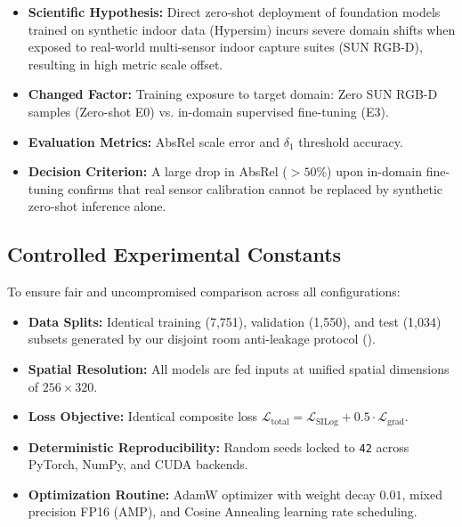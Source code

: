 \documentclass[twoside,final]{hcmut-report}
\begin{document}
\begin{itemize}[leftmargin=*]

  \item \textbf{Scientific Hypothesis:} Direct zero-shot deployment of foundation models trained on synthetic indoor data (Hypersim) incurs severe domain shifts when exposed to real-world multi-sensor indoor capture suites (SUN RGB-D), resulting in high metric scale offset.

  \item \textbf{Changed Factor:} Training exposure to target domain: Zero SUN RGB-D samples (Zero-shot E0) vs. in-domain supervised fine-tuning (E3).

  \item \textbf{Evaluation Metrics:} AbsRel scale error and $\delta_1$ threshold accuracy.

  \item \textbf{Decision Criterion:} A large drop in AbsRel ($>50\%$) upon in-domain fine-tuning confirms that real sensor calibration cannot be replaced by synthetic zero-shot inference alone.

\end{itemize}

\subsection{Controlled Experimental Constants}

To ensure fair and uncompromised comparison across all configurations:

\begin{itemize}

  \item \textbf{Data Splits:} Identical training (7,751), validation (1,550), and test (1,034) subsets generated by our disjoint room anti-leakage protocol ().

  \item \textbf{Spatial Resolution:} All models are fed inputs at unified spatial dimensions of $256 \times 320$.

  \item \textbf{Loss Objective:} Identical composite loss $\mathcal{L}_{\text{total}} = \mathcal{L}_{\text{SILog}} + 0.5 \cdot \mathcal{L}_{\text{grad}}$.

  \item \textbf{Deterministic Reproducibility:} Random seeds locked to \texttt{42} across PyTorch, NumPy, and CUDA backends.

  \item \textbf{Optimization Routine:} AdamW optimizer with weight decay $0.01$, mixed precision FP16 (AMP), and Cosine Annealing learning rate scheduling.

\end{itemize}
\end{document}
